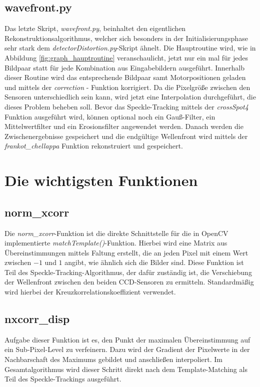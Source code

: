 \subsection{wavefront.py}

Das letzte Skript, \textit{wavefront.py}, beinhaltet den eigentlichen Rekonstruktionsalgorithmus, welcher sich besonders in der Initialisierungsphase sehr stark dem \textit{detectorDistortion.py}-Skript ähnelt. Die Hauptroutine wird, wie in Abbildung \ref{fig:graph_hauptroutine} veranschaulicht, jetzt nur ein mal für jedes Bildpaar statt für jede Kombination aus Eingabebildern ausgeführt. Innerhalb dieser Routine wird das entsprechende Bildpaar samt Motorpositionen geladen und mittels der \textit{correction} - Funktion korrigiert. Da die Pixelgröße zwischen den Sensoren unterschiedlich sein kann, wird jetzt eine Interpolation durchgeführt, die dieses Problem beheben soll. Bevor das Speckle-Tracking mittels der \textit{crossSpot4} Funktion ausgeführt wird, können optional noch ein Gauß-Filter, ein Mittelwertfilter und ein Erosionsfilter angewendet werden. Danach werden die Zwischenergebnisse gespeichert und die endgültige Wellenfront wird mittels der \textit{frankot\_chellappa} Funktion rekonstruiert und gespeichert. 

\section{Die wichtigsten Funktionen}

\subsection{norm\_xcorr}

Die \textit{norm\_xcorr}-Funktion ist die direkte Schnittstelle für die in OpenCV implementierte \textit{matchTemplate()}-Funktion. Hierbei wird eine Matrix aus Übereinstimmungen mittels Faltung erstellt, die an jeden Pixel mit einem Wert zwischen $-1$ und $1$ angibt, wie ähnlich sich die Bilder sind. Diese Funktion ist Teil des Speckle-Tracking-Algorithmus, der dafür zuständig ist, die Verschiebung der Wellenfront zwischen den beiden \gls{CCD}-Sensoren zu ermitteln. Standardmäßig wird hierbei der Kreuzkorrelationskoeffizient verwendet. 

\subsection{nxcorr\_disp}

Aufgabe dieser Funktion ist es, den Punkt der maximalen Übereinstimmung auf ein Sub-Pixel-Level zu verfeinern. Dazu wird der Gradient der Pixelwerte in der Nachbarschaft des Maximums gebildet und anschließen interpoliert. Im Gesamtalgorithmus wird dieser Schritt direkt nach dem Template-Matching als Teil des Speckle-Trackings ausgeführt.

